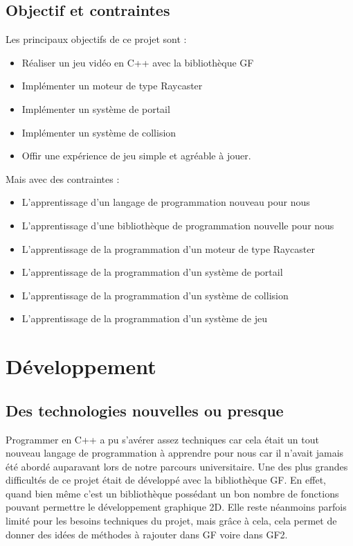 \documentclass[11pt]{article}
\begin{document}
\subsection{Objectif et contraintes}

Les principaux objectifs de ce projet sont :
\begin{itemize}
	\item Réaliser un jeu vidéo en C++ avec la bibliothèque GF
	\item Implémenter un moteur de type Raycaster
	\item Implémenter un système de portail
	\item Implémenter un système de collision
	\item Offir une expérience de jeu simple et agréable à jouer.
\end{itemize}

Mais avec des contraintes :
\begin{itemize}
	\item L'apprentissage d'un langage de programmation nouveau pour nous
	\item L'apprentissage d'une bibliothèque de programmation nouvelle pour nous
	\item L'apprentissage de la programmation d'un moteur de type Raycaster
	\item L'apprentissage de la programmation d'un système de portail
	\item L'apprentissage de la programmation d'un système de collision
	\item L'apprentissage de la programmation d'un système de jeu
\end{itemize}



\section{Développement}
\subsection{Des technologies nouvelles ou presque}
Programmer en C++ a pu s'avérer assez techniques car cela était un tout nouveau langage de programmation à apprendre pour nous car il n'avait jamais été abordé auparavant lors de notre parcours universitaire.
Une des plus grandes difficultés de ce projet était de développé avec la bibliothèque GF. En effet, quand bien même c'est un bibliothèque possédant un bon nombre de fonctions pouvant permettre le développement graphique 2D. Elle reste néanmoins parfois limité pour les besoins techniques du projet, mais grâce à cela, cela permet de donner des idées de méthodes à rajouter dans GF voire dans GF2.\cite{GF2}
\end{document}
